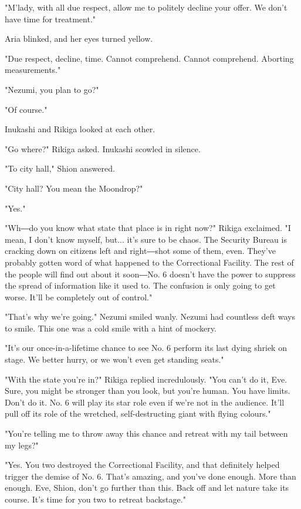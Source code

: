 "M'lady, with all due respect, allow me to politely decline your offer.
We don't have time for treatment."

Aria blinked, and her eyes turned yellow.

{\sffamily "Due respect, decline, time. Cannot comprehend. Cannot comprehend.
Aborting measurements."}

"Nezumi, you plan to go?"

"Of course."

Inukashi and Rikiga looked at each other.

"Go where?" Rikiga asked. Inukashi scowled in silence.

"To city hall," Shion answered.

"City hall? You mean the Moondrop?"

"Yes."

"Wh―do you know what state that place is in right now?" Rikiga
exclaimed. "I mean, I don't know myself, but... it's sure to be chaos.
The Security Bureau is cracking down on citizens left and right―shot
some of them, even. They've probably gotten word of what happened to the
Correctional Facility. The rest of the people will find out about it
soon―No. 6 doesn't have the power to suppress the spread of information
like it used to. The confusion is only going to get worse. It'll be
completely out of control."

"That's why we're going." Nezumi smiled wanly. Nezumi had countless deft
ways to smile. This one was a cold smile with a hint of mockery.

"It's our once-in-a-lifetime chance to see No. 6 perform its last dying
shriek on stage. We better hurry, or we won't even get standing seats."

"With the state you're in?" Rikiga replied incredulously. "You can't do
it, Eve. Sure, you might be stronger than you look, but you're human.
You have limits. Don't do it. No. 6 will play its star role even if
we're not in the audience. It'll pull off its role of the wretched,
self-destructing giant with flying colours."

"You're telling me to throw away this chance and retreat with my tail
between my legs?"

"Yes. You two destroyed the Correctional Facility, and that definitely
helped trigger the demise of No. 6. That's amazing, and you've done
enough. More than enough. Eve, Shion, don't go further than this. Back
off and let nature take its course. It's time for you two to retreat
backstage."

